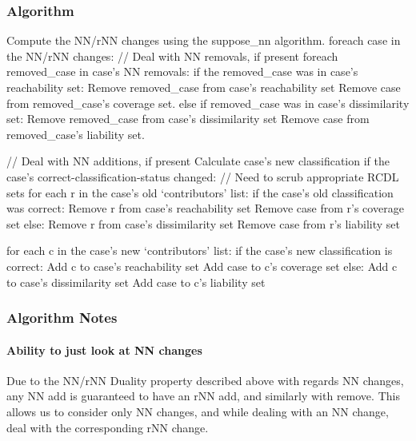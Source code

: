 \documentclass[a4paper,11pt]{report}
\begin{document}
\newpage
\subsubsection{Algorithm} \nopagebreak[4]
\begin{code}
Compute the NN/rNN changes using the suppose_nn algorithm.
foreach case in the NN/rNN changes:
  // Deal with NN removals, if present
  foreach removed_case in case's NN removals:
    if the removed_case was in case's reachability set:
      Remove removed_case from case's reachability set
      Remove case from removed_case's coverage set.
    else if removed_case was in case's dissimilarity set:
      Remove removed_case from case's dissimilarity set
      Remove case from removed_case's liability set.

  // Deal with NN additions, if present  
  Calculate case's new classification
  if the case's correct-classification-status changed:
    // Need to scrub appropriate RCDL sets
    for each r in the case's old `contributors' list:
      if the case's old classification was correct:
        Remove r from case's reachability set
        Remove case from r's coverage set
      else:
        Remove r from case's dissimilarity set
        Remove case from r's liability set
        
  for each c in the case's new `contributors' list:
    if the case's new classification is correct:
      Add c to case's reachability set
      Add case to c's coverage set
    else:
      Add c to case's dissimilarity set
      Add case to c's liability set
\end{code}

\subsubsection{Algorithm Notes}
\paragraph{Ability to just look at NN changes}
Due to the NN/rNN Duality property described above with regards NN changes, any NN add is guaranteed to have an rNN add, and similarly with remove. This allows us to consider only NN changes, and while dealing with an NN change, deal with the corresponding rNN change.
\end{document}
